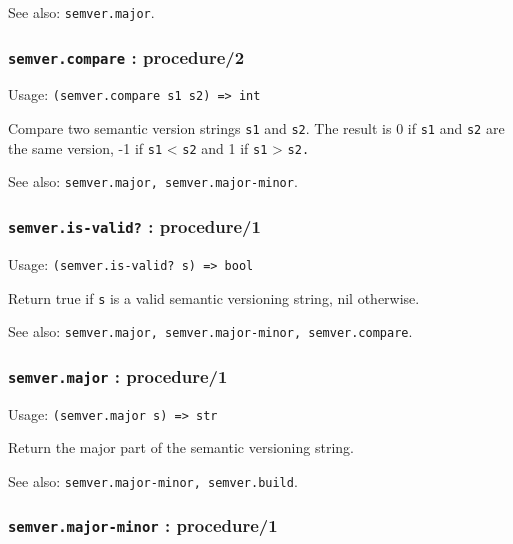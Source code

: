 \documentclass[
]{article}
\newcommand{\passthrough}[1]{#1}
\begin{document}
See also: \passthrough{\lstinline!semver.major!}.

\hypertarget{semver.compare-procedure2}{%
\subsubsection{\texorpdfstring{\texttt{semver.compare} :
procedure/2}{semver.compare : procedure/2}}\label{semver.compare-procedure2}}

Usage: \passthrough{\lstinline!(semver.compare s1 s2) => int!}

Compare two semantic version strings \passthrough{\lstinline!s1!} and
\passthrough{\lstinline!s2!}. The result is 0 if
\passthrough{\lstinline!s1!} and \passthrough{\lstinline!s2!} are the
same version, -1 if \passthrough{\lstinline!s1!} \textless{}
\passthrough{\lstinline!s2!} and 1 if \passthrough{\lstinline!s1!}
\textgreater{} \passthrough{\lstinline!s2.!}

See also: \passthrough{\lstinline!semver.major, semver.major-minor!}.

\hypertarget{semver.is-valid-procedure1}{%
\subsubsection{\texorpdfstring{\texttt{semver.is-valid?} :
procedure/1}{semver.is-valid? : procedure/1}}\label{semver.is-valid-procedure1}}

Usage: \passthrough{\lstinline!(semver.is-valid? s) => bool!}

Return true if \passthrough{\lstinline!s!} is a valid semantic
versioning string, nil otherwise.

See also:
\passthrough{\lstinline!semver.major, semver.major-minor, semver.compare!}.

\hypertarget{semver.major-procedure1}{%
\subsubsection{\texorpdfstring{\texttt{semver.major} :
procedure/1}{semver.major : procedure/1}}\label{semver.major-procedure1}}

Usage: \passthrough{\lstinline!(semver.major s) => str!}

Return the major part of the semantic versioning string.

See also: \passthrough{\lstinline!semver.major-minor, semver.build!}.

\hypertarget{semver.major-minor-procedure1}{%
\subsubsection{\texorpdfstring{\texttt{semver.major-minor} :
procedure/1}{semver.major-minor : procedure/1}}\label{semver.major-minor-procedure1}}
\end{document}
